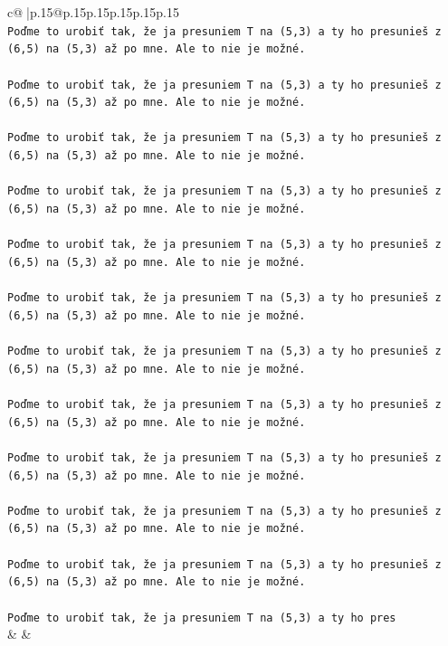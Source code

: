 \documentclass{article}
\begin{document}
{\begin{supertabular}{c@{$\;$}|p{.15\linewidth}@{}p{.15\linewidth}p{.15\linewidth}p{.15\linewidth}p{.15\linewidth}p{.15\linewidth}}
{{{\\ 
\texttt{Poďme to urobiť tak, že ja presuniem T na (5,3) a ty ho presunieš z (6,5) na (5,3) až po mne. Ale to nie je možné.} \\
\\ 
\texttt{Poďme to urobiť tak, že ja presuniem T na (5,3) a ty ho presunieš z (6,5) na (5,3) až po mne. Ale to nie je možné.} \\
\\ 
\texttt{Poďme to urobiť tak, že ja presuniem T na (5,3) a ty ho presunieš z (6,5) na (5,3) až po mne. Ale to nie je možné.} \\
\\ 
\texttt{Poďme to urobiť tak, že ja presuniem T na (5,3) a ty ho presunieš z (6,5) na (5,3) až po mne. Ale to nie je možné.} \\
\\ 
\texttt{Poďme to urobiť tak, že ja presuniem T na (5,3) a ty ho presunieš z (6,5) na (5,3) až po mne. Ale to nie je možné.} \\
\\ 
\texttt{Poďme to urobiť tak, že ja presuniem T na (5,3) a ty ho presunieš z (6,5) na (5,3) až po mne. Ale to nie je možné.} \\
\\ 
\texttt{Poďme to urobiť tak, že ja presuniem T na (5,3) a ty ho presunieš z (6,5) na (5,3) až po mne. Ale to nie je možné.} \\
\\ 
\texttt{Poďme to urobiť tak, že ja presuniem T na (5,3) a ty ho presunieš z (6,5) na (5,3) až po mne. Ale to nie je možné.} \\
\\ 
\texttt{Poďme to urobiť tak, že ja presuniem T na (5,3) a ty ho presunieš z (6,5) na (5,3) až po mne. Ale to nie je možné.} \\
\\ 
\texttt{Poďme to urobiť tak, že ja presuniem T na (5,3) a ty ho presunieš z (6,5) na (5,3) až po mne. Ale to nie je možné.} \\
\\ 
\texttt{Poďme to urobiť tak, že ja presuniem T na (5,3) a ty ho presunieš z (6,5) na (5,3) až po mne. Ale to nie je možné.} \\
\\ 
\texttt{Poďme to urobiť tak, že ja presuniem T na (5,3) a ty ho pres} \\
            }
        }
    }
    & & \\ \\


\end{supertabular}}
\end{document}
